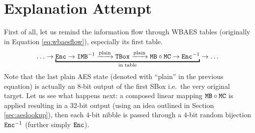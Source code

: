 \section{Explanation Attempt}
\label{sec:attempt}

First of all, let us remind the information flow through WBAES tables (originally in Equation \ref{eq:wbaesflow}), especially its first table.
\begin{equation}
\label{eq:wbaesfirst}
	\ldots \rarr \underbracket{\Enc \rarr \IMB^{-1} \xrightarrow{\textnormal{plain}} \TBox \xrightarrow{\textnormal{plain}} \MB \circ \MC \rarr \Enc^{-1}}_{\textnormal{in table}} \rarr \ldots
\end{equation}
Note that the last plain AES state (denoted with ``plain'' in the previous equation) is actually an $8$-bit output of the first SBox i.e.\ the very original target. Let us see what happens next: a composed linear mapping $\texttt{MB}\circ\texttt{MC}$ is applied resulting in a $32$-bit output (using an idea outlined in Section \ref{sec:aeslookup}), then each $4$-bit nibble is passed through a $4$-bit random bijection $\texttt{Enc}^{-1}$ (further simply $\texttt{Enc}$).

